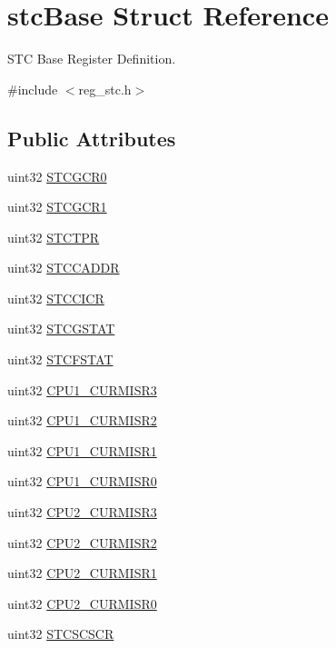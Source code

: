 \hypertarget{structstcBase}{}\section{stc\+Base Struct Reference}
\label{structstcBase}


S\+TC Base Register Definition.  




{\ttfamily \#include $<$reg\+\_\+stc.\+h$>$}

\subsection*{Public Attributes}
\begin{DoxyCompactItemize}
\item 
uint32 \mbox{\hyperlink{structstcBase_ad3d1df0a36998165b922a529408d1a00}{S\+T\+C\+G\+C\+R0}}
\item 
uint32 \mbox{\hyperlink{structstcBase_aa22a6f33c7396b59020ff5a7ed91247a}{S\+T\+C\+G\+C\+R1}}
\item 
uint32 \mbox{\hyperlink{structstcBase_ac9ab443ec8b52d857ff88182efcf7698}{S\+T\+C\+T\+PR}}
\item 
uint32 \mbox{\hyperlink{structstcBase_ab54db2e64cb41f15f9562747066fd4a4}{S\+T\+C\+C\+A\+D\+DR}}
\item 
uint32 \mbox{\hyperlink{structstcBase_a7d9de0f49f992505200d799d36bc3695}{S\+T\+C\+C\+I\+CR}}
\item 
uint32 \mbox{\hyperlink{structstcBase_a3bd02afb56e5a93b17de45f917c38236}{S\+T\+C\+G\+S\+T\+AT}}
\item 
uint32 \mbox{\hyperlink{structstcBase_a15e35e466fbe5f4340470031fa274699}{S\+T\+C\+F\+S\+T\+AT}}
\item 
uint32 \mbox{\hyperlink{structstcBase_a10646b4f62ec77937774fa74fc9614a5}{C\+P\+U1\+\_\+\+C\+U\+R\+M\+I\+S\+R3}}
\item 
uint32 \mbox{\hyperlink{structstcBase_a9a72b89cb03faf1474570778c4e997f0}{C\+P\+U1\+\_\+\+C\+U\+R\+M\+I\+S\+R2}}
\item 
uint32 \mbox{\hyperlink{structstcBase_ab8abc5473a904be22783dbfa594e772f}{C\+P\+U1\+\_\+\+C\+U\+R\+M\+I\+S\+R1}}
\item 
uint32 \mbox{\hyperlink{structstcBase_a280e2e812c90963966ced8f37e02fead}{C\+P\+U1\+\_\+\+C\+U\+R\+M\+I\+S\+R0}}
\item 
uint32 \mbox{\hyperlink{structstcBase_a8e7b41345354eded3f19e91ba7c7247b}{C\+P\+U2\+\_\+\+C\+U\+R\+M\+I\+S\+R3}}
\item 
uint32 \mbox{\hyperlink{structstcBase_a520b73e69a19c43a6a25852920bb72b5}{C\+P\+U2\+\_\+\+C\+U\+R\+M\+I\+S\+R2}}
\item 
uint32 \mbox{\hyperlink{structstcBase_a351dceeca7e417893d1c602252d68d29}{C\+P\+U2\+\_\+\+C\+U\+R\+M\+I\+S\+R1}}
\item 
uint32 \mbox{\hyperlink{structstcBase_a20f8416f5b875861c6ca9d57fca36937}{C\+P\+U2\+\_\+\+C\+U\+R\+M\+I\+S\+R0}}
\item 
uint32 \mbox{\hyperlink{structstcBase_a58484dd13829b31b11d96e69025a3d1a}{S\+T\+C\+S\+C\+S\+CR}}
\end{DoxyCompactItemize}


